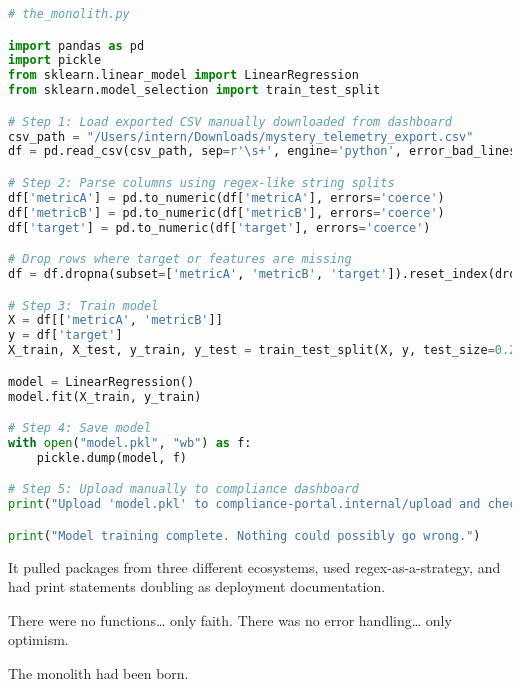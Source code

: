 \begin{lstlisting}[language=Python]
# the_monolith.py

import pandas as pd
import pickle
from sklearn.linear_model import LinearRegression
from sklearn.model_selection import train_test_split

# Step 1: Load exported CSV manually downloaded from dashboard
csv_path = "/Users/intern/Downloads/mystery_telemetry_export.csv"
df = pd.read_csv(csv_path, sep=r'\s+', engine='python', error_bad_lines=False)

# Step 2: Parse columns using regex-like string splits
df['metricA'] = pd.to_numeric(df['metricA'], errors='coerce')
df['metricB'] = pd.to_numeric(df['metricB'], errors='coerce')
df['target'] = pd.to_numeric(df['target'], errors='coerce')

# Drop rows where target or features are missing
df = df.dropna(subset=['metricA', 'metricB', 'target']).reset_index(drop=True)

# Step 3: Train model
X = df[['metricA', 'metricB']]
y = df['target']
X_train, X_test, y_train, y_test = train_test_split(X, y, test_size=0.2)

model = LinearRegression()
model.fit(X_train, y_train)

# Step 4: Save model
with open("model.pkl", "wb") as f:
    pickle.dump(model, f)

# Step 5: Upload manually to compliance dashboard
print("Upload 'model.pkl' to compliance-portal.internal/upload and check the box manually.")

print("Model training complete. Nothing could possibly go wrong.")
\end{lstlisting}

It pulled packages from three different ecosystems, used regex-as-a-strategy, and had print statements doubling as deployment documentation.

There were no functions… only faith.  
There was no error handling… only optimism.

The monolith had been born.

